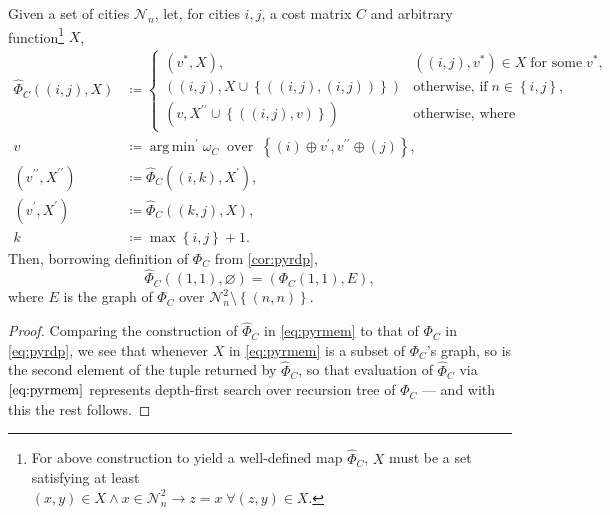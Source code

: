 \documentclass[titlepage,twoside,index=totoc,bibliography=totoc]{scrartcl}
\newcommand{\annotation}[1]{\marginpar{\small\itshape\color{green}#1}}
\DeclareMathOperator*{\argmin}{arg\,min}
\numberwithin{equation}{section}
\numberwithin{figure}{section}
\numberwithin{table}{section}
\begin{document}
\begin{proposition}
\label{prop:pyrmem}
  Given a set of cities $\mathcal{N}_n$, let, for cities $i,j$, a cost matrix $C$ and arbitrary function\footnote{%
    For above construction to yield a well-defined map $\widehat{\Phi}_C$, $X$ must be a set satisfying at least \\$(x,y) \in X \wedge x \in \mathcal{N}_n^2 \rightarrow z=x \; \forall (z,y) \in X$.
  } $X$,
  \begin{align}
    \label{eq:pyrmem}
    \widehat{\Phi}_C\left((i,j),X\right) & \coloneqq
    \begin{cases}
      \left(v^\ast,X\right), & \left((i,j),v^\ast\right) \in X \;\text{for some}\; v^\ast,
      \\
      \left((i,j),X \cup \left\{\left((i,j),(i,j)\right)\right\}\right) & \text{otherwise, if}\; n \in \left\{i,j\right\},
      \\
      \left(v,X^{\prime\prime} \cup \left\{\left((i,j),v\right)\right\}\right) & \text{otherwise, where}
    \end{cases}
    \\
    v & \coloneqq {\argmin}^\prime \omega_C
    \;\;\text{over}\;\; {\left\{(i) \oplus v^\prime, v^{\prime\prime} \oplus (j) \right\}},
    \nonumber
    \\
    \left(v^{\prime\prime},X^{\prime\prime}\right) & \coloneqq \widehat{\Phi}_C\left((i,k),X^\prime\right),
    \nonumber
    \\
    \left(v^{\prime},X^{\prime}\right) & \coloneqq \widehat{\Phi}_C\left((k,j),X\right),
    \nonumber
    \\
    k & \coloneqq \max \left\{i,j\right\} + 1.
    \nonumber
  \end{align}
  Then, borrowing definition of $\Phi_C$ from \cref{cor:pyrdp},
  \[
    \widehat{\Phi}_C\left((1,1),\varnothing\right) = \left(\Phi_C\left(1,1\right),E\right),
  \]
  where $E$ is the graph of $\Phi_C$ over $\mathcal{N}_n^2 \setminus \left\{(n,n)\right\}$.
\end{proposition}
\begin{proof}
  Comparing the construction of $\widehat{\Phi}_C$ in \cref{eq:pyrmem} to
  that of $\Phi_C$ in \cref{eq:pyrdp}, we see that whenever $X$ in
  \eqref{eq:pyrmem} is a subset of $\Phi_C$'s graph, so is the second
  element of the tuple returned by $\widehat{\Phi}_C$, so that evaluation of
  $\widehat{\Phi}_C$ via $\eqref{eq:pyrmem}$ represents depth-first
  search over recursion tree of $\Phi_C$ --- and with this the rest
  follows.
\end{proof}
\end{document}
